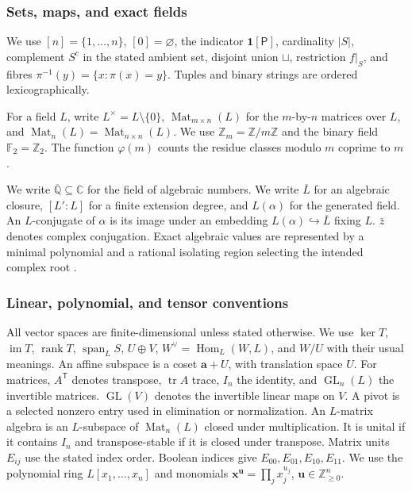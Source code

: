 \documentclass[11pt,letterpaper,onecolumn]{article}
\theoremstyle{plain}
\theoremstyle{definition}
\theoremstyle{remark}
\newcommand{\AlgNums}{\overline{\mathbb Q}}
\newcommand{\Ftwo}{\mathbb F_2}
\newcommand{\GL}{\operatorname{GL}}
\newcommand{\Mat}{\operatorname{Mat}}
\newcommand{\Span}{\operatorname{span}}
\newcommand{\rank}{\operatorname{rank}}
\newcommand{\one}{\mathbf 1}
\begin{document}
\subsubsection{Sets, maps, and exact fields}
\label{subsubsec:set-field-exact}

We use \([n]=\{1,\ldots,n\}\), \([0]=\varnothing\), the indicator
\(\one[\mathsf P]\), cardinality \(|S|\), complement \(S^c\) in the
stated ambient set, disjoint union \(\sqcup\), restriction
\(f|_S\), and fibres \(\pi^{-1}(y)=\{x:\pi(x)=y\}\).
Tuples and binary strings are ordered lexicographically.

For a field \(L\), write \(L^\times=L\setminus\{0\}\),
\(\Mat_{m\times n}(L)\) for the \(m\)-by-\(n\) matrices over \(L\),
and \(\Mat_n(L)=\Mat_{n\times n}(L)\).
We use \(\mathbb Z_m=\mathbb Z/m\mathbb Z\) and the binary field
\(\Ftwo=\mathbb Z_2\).  The function \(\varphi(m)\) counts the residue
classes modulo \(m\) coprime to \(m\).

We write \(\AlgNums\subseteq\mathbb C\) for the field of algebraic numbers.
We write \(\overline L\) for an algebraic closure, \([L':L]\) for a
finite extension degree, and \(L(\alpha)\) for the generated field.
An \(L\)-conjugate of \(\alpha\) is its image under an embedding
\(L(\alpha)\hookrightarrow\overline L\) fixing \(L\). \(\bar z\) denotes
complex conjugation.  Exact algebraic values are represented by a minimal
polynomial and a rational isolating region selecting the intended complex
root \cite{Cohen1993}.

\subsubsection{Linear, polynomial, and tensor conventions}
\label{subsubsec:linear-polynomial-tensor}

All vector spaces are finite-dimensional unless stated otherwise.  We use
\(\ker T\), \(\operatorname{im}T\), \(\rank T\), \(\Span_L S\),
\(U\oplus V\), \(W^\vee=\operatorname{Hom}_L(W,L)\), and \(W/U\)
with their usual meanings.
An affine subspace is a coset \({\mathbf{a}}+U\), with translation space \(U\).
For matrices, \(A^{\mathsf T}\) denotes transpose, \(\operatorname{tr}A\)
trace, \(I_n\) the identity, and \(\GL_n(L)\) the invertible matrices.
\(\GL(V)\) denotes the invertible linear maps on \(V\).
A pivot is a selected nonzero entry used in elimination or normalization.
An \(L\)-matrix algebra is an \(L\)-subspace of \(\Mat_n(L)\) closed
under multiplication. It is unital if it contains \(I_n\) and
transpose-stable if it is closed under transpose.  Matrix units \(E_{ij}\)
use the stated index order. Boolean indices give \(E_{00},E_{01},E_{10},E_{11}\).
We use the polynomial ring \(L[x_1,\ldots,x_n]\) and monomials
\({\mathbf{x}}^{\mathbf{u}}=\prod_jx_j^{u_j}\), \({\mathbf{u}}\in\mathbb Z_{\ge0}^n\).
\end{document}
